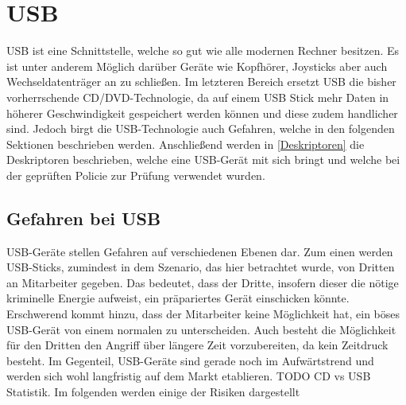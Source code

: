 \chapter{USB}
USB ist eine Schnittstelle, welche so gut wie alle modernen Rechner besitzen. Es ist unter anderem Möglich darüber Geräte wie Kopfhörer, Joysticks aber auch Wechseldatenträger an zu schließen. Im letzteren Bereich ersetzt USB die bisher vorherrschende CD/DVD-Technologie, da auf einem USB Stick mehr Daten in höherer Geschwindigkeit gespeichert werden können und diese zudem handlicher sind. Jedoch birgt die USB-Technologie auch Gefahren, welche in den folgenden Sektionen beschrieben werden. Anschließend werden in \ref{Deskriptoren} die Deskriptoren beschrieben, welche eine USB-Gerät mit sich bringt und welche bei der geprüften Policie zur Prüfung verwendet wurden.

\section{Gefahren bei USB}\label{GefBeiUSB}
USB-Geräte stellen Gefahren auf verschiedenen Ebenen dar. Zum einen werden USB-Sticks, zumindest in dem Szenario, das hier betrachtet wurde, von Dritten an Mitarbeiter gegeben. Das bedeutet, dass der Dritte, insofern dieser die nötige kriminelle Energie aufweist, ein präpariertes Gerät einschicken könnte. Erschwerend kommt hinzu, dass der Mitarbeiter keine Möglichkeit hat, ein böses USB-Gerät von einem normalen zu unterscheiden. Auch besteht die Möglichkeit für den Dritten den Angriff über längere Zeit vorzubereiten, da kein Zeitdruck besteht. Im Gegenteil, USB-Geräte sind gerade noch im Aufwärtstrend und werden sich wohl langfristig auf dem Markt etablieren. TODO CD vs USB Statistik. Im folgenden werden einige der Risiken dargestellt

